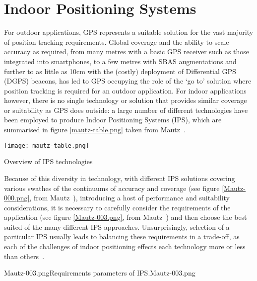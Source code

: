 

\section{Indoor Positioning Systems}

For outdoor applications, GPS represents a suitable solution for the vast majority of position tracking requirements. Global coverage and the ability to scale accuracy as required, from many metres with a basic GPS receiver such as those integrated into smartphones, to a few metres with SBAS augmentations and further to as little as 10cm with the (costly) deployment of Differential GPS (DGPS) beacons, has led to GPS occupying the role of the `go to' solution where position tracking is required for an outdoor application. For indoor applications however, there is no single technology or solution that provides similar coverage or suitability as GPS does outside: a large number of different technologies have been employed to produce Indoor Positioning Systems (IPS), which are summarised in figure \ref{mautz-table.png} taken from Mautz~\cite{Mautz2012}.

\begin{table}
	\begin{center}
		\texttt{[image: mautz-table.png]}
	\end{center}
	\caption{Overview of IPS technologies}
	\label{mautz-table.png}
\end{table}

Because of this diversity in technology, with different IPS solutions covering various swathes of the continuums of accuracy and coverage (see figure \ref{Mautz-000.png}, from Mautz~\cite{Mautz2012}), introducing a host of performance and suitability considerations, it is necessary to carefully consider the requirements of the application (see figure \ref{Mautz-003.png}, from Mautz~\cite{Mautz2012}) and then choose the best suited of the many different IPS approaches. Unsurprisingly, selection of a particular IPS usually leads to balancing these requirements in a trade-off, as each of the challenges of indoor positioning effects each technology more or less than others~\cite{Mautz2009}.

       {Mautz-003.png}{Requirements parameters of IPS.}{Mautz-003.png}


